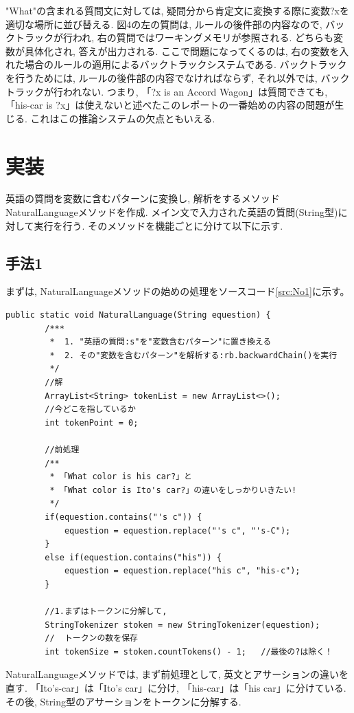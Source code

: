 \documentclass[uplatex,12pt]{jsarticle}
\begin{document}
"What"の含まれる質問文に対しては, 疑問分から肯定文に変換する際に変数?xを適切な場所に並び替える. 図4の左の質問は, ルールの後件部の内容なので, バックトラックが行われ, 右の質問ではワーキングメモリが参照される. どちらも変数が具体化され, 答えが出力される. ここで問題になってくるのは, 右の変数を入れた場合のルールの適用によるバックトラックシステムである. バックトラックを行うためには, ルールの後件部の内容でなければならず, それ以外では, バックトラックが行われない. つまり, 「?x is an Accord Wagon」は質問できても, 「his-car is ?x」は使えないと述べたこのレポートの一番始めの内容の問題が生じる. これはこの推論システムの欠点ともいえる.

\section{実装}
英語の質問を変数に含むパターンに変換し, 解析をするメソッドNaturalLanguageメソッドを作成. メイン文で入力された英語の質問(String型)に対して実行を行う. そのメソッドを機能ごとに分けて以下に示す.

\subsection{手法1}
まずは, NaturalLanguageメソッドの始めの処理をソースコード\ref{src:No1}に示す。
\begin{lstlisting}[caption=NaturalLanguageメソッドその1, label=src:No1]
    public static void NaturalLanguage(String equestion) {
    	/***
    	 *	1. "英語の質問:s"を"変数含むパターン"に置き換える
    	 *	2. その"変数を含むパターン"を解析する:rb.backwardChain()を実行
    	 */
    	//解
    	ArrayList<String> tokenList = new ArrayList<>();
    	//今どこを指しているか
    	int tokenPoint = 0;

    	//前処理
    	/**
    	 * 「What color is his car?」と
    	 * 「What color is Ito's car?」の違いをしっかりいきたい!
    	 */
    	if(equestion.contains("'s c")) {
    		equestion = equestion.replace("'s c", "'s-C");
    	}
    	else if(equestion.contains("his")) {
    		equestion = equestion.replace("his c", "his-c");
    	}

    	//1.まずはトークンに分解して,
    	StringTokenizer stoken = new StringTokenizer(equestion);
    	//  トークンの数を保存
    	int tokenSize = stoken.countTokens() - 1;	//最後の?は除く！
\end{lstlisting}

NaturalLanguageメソッドでは, まず前処理として, 英文とアサーションの違いを直す. 「Ito's-car」は「Ito's car」に分け, 「his-car」は「his car」に分けている. その後, String型のアサーションをトークンに分解する. 
\end{document}
